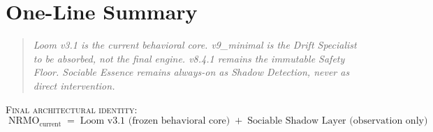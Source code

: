 \chapter{One-Line Summary}
\label{ch:one_line_summary}

\begin{quote}\large
\emph{Loom v3.1 is the current behavioral core.
v9\_minimal is the Drift Specialist to be absorbed, not the final
engine. v8.4.1 remains the immutable Safety Floor. Sociable Essence
remains always-on as Shadow Detection, never as direct
intervention.}
\end{quote}

\bigskip
\noindent
\textsc{Final architectural identity:}
\begin{equation*}
\boxed{\;
  \text{NRMO}_{\text{current}}
  \;=\;
  \text{Loom v3.1 (frozen behavioral core)}
  \;+\;
  \text{Sociable Shadow Layer (observation only)}
\;}
\end{equation*}
